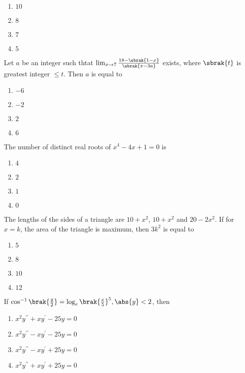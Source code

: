 	\begin{enumerate}
		\item $10$ 
		\item $8$
		\item $7$
		\item $5$
	\end{enumerate}

    \item Let $a$ be an integer such thtat $\lim_{x \to 7} \frac{18 - \sbrak{1 - x}}{\sbrak{x - 3a}}$ exists, where $\sbrak{t}$ is greatest integer $\leq t$. Then $a$ is equal to
    \hfill{}

	\begin{enumerate}
		\item $-6$ 
		\item $-2$
		\item $2$
		\item $6$
	\end{enumerate}

    \item The number of distinct real roots of $x^4 - 4x + 1 = 0$ is
    \hfill{}

	\begin{enumerate}
		\item $4$ 
		\item $2$
		\item $1$
		\item $0$
	\end{enumerate}


    \item The lengths of the sides of a triangle are $10 + x^2$, $10 + x^2$ and $20 - 2x^2$. If for $x = k$, the area of the triangle is maximum, then $3k^2$ is equal to
    \hfill{}

	\begin{enumerate}
		\item $5$ 
		\item $8$
		\item $10$
		\item $12$
	\end{enumerate}

    \item If $\cos^{-1}{\brak{\frac{y}{2}}} = \log_{e}{\brak{\frac{x}{5}}}^{5}, \abs{y} < 2$, then
    \hfill{}

	\begin{enumerate}
		\item $x^2y^{\prime\prime} + xy^{\prime} - 25y = 0$ 
		\item $x^2y^{\prime\prime} - xy^{\prime} - 25y = 0$ 
		\item $x^2y^{\prime\prime} - xy^{\prime} + 25y = 0$ 
		\item $x^2y^{\prime\prime} + xy^{\prime} + 25y = 0$ 
	\end{enumerate}

